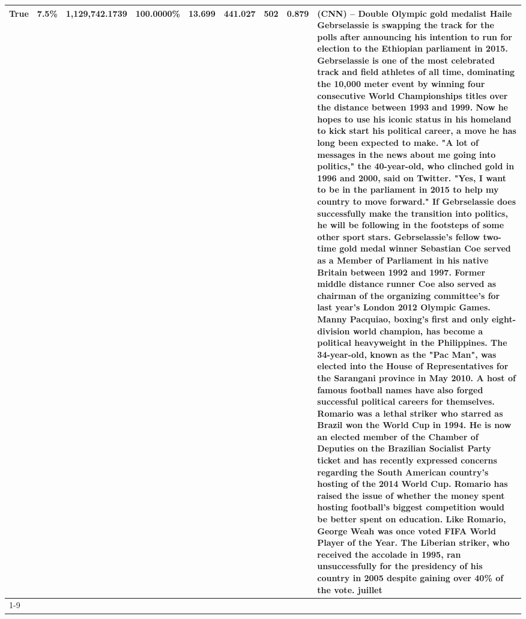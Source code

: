 \begin{table}[H]
{\begin{tabular}{lllrlllll}
True & 7.5\% & 1,129,742.1739 & \bfseries \color{red} 100.0000\% & 13.699 & 441.027 & 502 & 0.879 & (CNN) -- Double Olympic gold medalist Haile Gebrselassie is swapping the track for the polls after announcing his intention to run for election to the Ethiopian parliament in 2015. Gebrselassie is one of the most celebrated track and field athletes of all time, dominating the 10,000 meter event by winning four consecutive World Championships titles over the distance between 1993 and 1999. Now he hopes to use his iconic status in his homeland to kick start his political career, a move he has long been expected to make. "A lot of messages in the news about me going into politics," the 40-year-old, who clinched gold in 1996 and 2000, said on Twitter. "Yes, I want to be in the parliament in 2015 to help my country to move forward." If Gebrselassie does successfully make the transition into politics, he will be following in the footsteps of some other sport stars. Gebrselassie's fellow two-time gold medal winner Sebastian Coe served as a Member of Parliament in his native Britain between 1992 and 1997. Former middle distance runner Coe also served as chairman of the organizing committee's for last year's London 2012 Olympic Games. Manny Pacquiao, boxing's first and only eight-division world champion, has become a political heavyweight in the Philippines. The 34-year-old, known as the "Pac Man", was elected into the House of Representatives for the Sarangani province in May 2010. A host of famous football names have also forged successful political careers for themselves. Romario was a lethal striker who starred as Brazil won the World Cup in 1994. He is now an elected member of the Chamber of Deputies on the Brazilian Socialist Party ticket and has recently expressed concerns regarding the South American country's hosting of the 2014 World Cup. Romario has raised the issue of whether the money spent hosting football's biggest competition would be better spent on education. Like Romario, George Weah was once voted FIFA World Player of the Year. The Liberian striker, who received the accolade in 1995, ran unsuccessfully for the presidency of his country in 2005 despite gaining over 40\% of the vote. juillet \\
\cline{1-9}

\end{tabular}}
\end{table}
